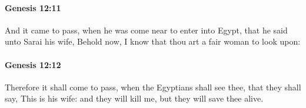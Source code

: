 		\paragraph{Genesis 12:11} %
			\label{GENESIS-12-11}

			And it came to pass, when he was come near to enter into Egypt, that he said unto Sarai his wife, Behold now, I know that thou art a fair woman to look upon:


		\paragraph{Genesis 12:12} %
			\label{GENESIS-12-12}

			Therefore it shall come to pass, when the Egyptians shall see thee, that they shall say, This is his wife: and they will kill me, but they will save thee alive.


